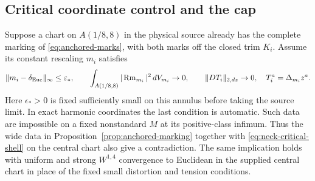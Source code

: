 \subsection{Critical coordinate control and the cap}\label{sec:critical-annulus}

\begin{proposition}\label{prop:neck-critical-shell}\label{prop:critical-annulus}
Suppose a chart on \(A(1/8,8)\) in the physical source already
has the complete marking of \eqref{eq:anchored-marks}, with both
marks off the closed trim \(K_i\). Assume its constant
rescaling \(m_i\) satisfies
\begin{equation}\label{eq:neck-critical-shell}
 \|m_i-\delta_{\rm Euc}\|_\infty\le\varepsilon_*,\qquad
 \int_{A(1/8,8)}|\operatorname{Rm}_{m_i}|^2\,dV_{m_i}\to0,\qquad
 \|D T_i\|_{2,dz}\to0,\quad T_i^a=\Delta_{m_i}z^a .
\end{equation}
Here \(\epsilon_*>0\) is fixed sufficiently small on this annulus
before taking the source limit. In exact harmonic coordinates the
last condition is automatic. Such data are impossible on a fixed
nonstandard \(M\) at its positive-class infimum. Thus the wide
data in Proposition~\ref{prop:anchored-marking} together with
\eqref{eq:neck-critical-shell} on the central chart also give a
contradiction. The same implication holds with uniform and strong
\(W^{1,4}\) convergence to Euclidean in the supplied central chart
in place of the fixed small distortion and tension conditions.
\end{proposition}

